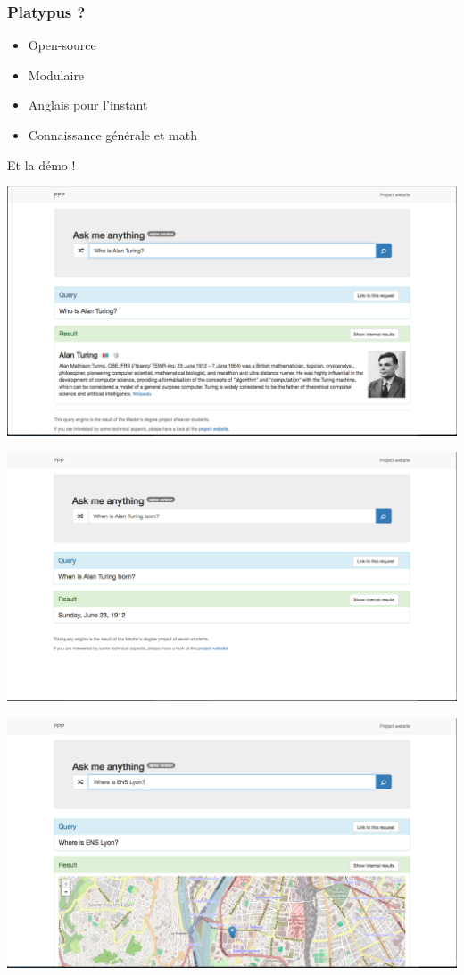 \begin{frame}
    \frametitle{Platypus ?}
    \begin{itemize}
        \item<1-> \alert{Open-source}
        \item<2-> \alert{Modulaire}
        \item<3-> \alert{Anglais} pour l'instant
        \item<4-> \alert{Connaissance générale} et math
    \end{itemize}
\end{frame}

\begin{frame}
    \begin{center}
        \Huge Et la démo !
    \end{center}
\end{frame}

\begin{frame}[plain]
    \includegraphics[width=\linewidth]{figures/demo-whoIsAlanTuring.png}
\end{frame}

\begin{frame}[plain]
    \includegraphics[width=\linewidth]{figures/demo-whenIsAlanTuringBorn.png}
\end{frame}

\begin{frame}[plain]
    \includegraphics[width=\linewidth]{figures/demo-whereIsEnsLyon.png}
\end{frame}
